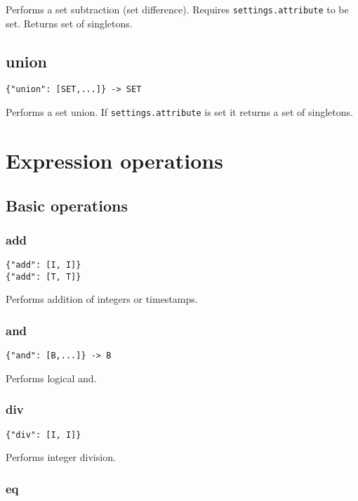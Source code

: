 \documentclass[a4paper]{article}
\begin{document}
Performs a set subtraction (set difference). Requires
\verb|settings.attribute| to be set. Returns set of singletons.

\subsection{union}

\begin{verbatim}
{"union": [SET,...]} -> SET
\end{verbatim}

Performs a set union. If \verb|settings.attribute| is set it returns a
set of singletons.

\section{Expression operations}

\subsection{Basic operations}

\subsubsection{add}

\begin{verbatim}
{"add": [I, I]}
{"add": [T, T]}
\end{verbatim}

Performs addition of integers or timestamps.

\subsubsection{and}

\begin{verbatim}
{"and": [B,...]} -> B
\end{verbatim}

Performs logical and. 

\subsubsection{div}

\begin{verbatim}
{"div": [I, I]}
\end{verbatim}

Performs integer division.

\subsubsection{eq}
\end{document}
